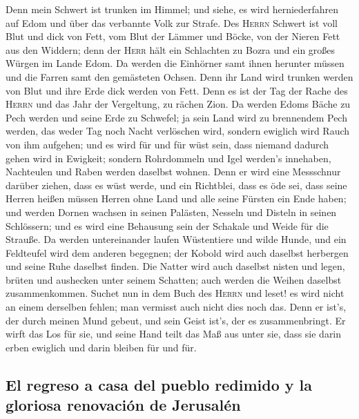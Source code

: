  Denn mein Schwert ist trunken im Himmel; und siehe, es
wird herniederfahren auf Edom und über das verbannte Volk zur Strafe.
 Des \textsc{Herrn} Schwert ist voll Blut und dick von
Fett, vom Blut der Lämmer und Böcke, von der Nieren Fett aus den
Widdern; denn der \textsc{Herr} hält ein Schlachten zu Bozra und ein
großes Würgen im Lande Edom.  Da werden die Einhörner samt
ihnen herunter müssen und die Farren samt den gemästeten Ochsen. Denn
ihr Land wird trunken werden von Blut und ihre Erde dick werden von
Fett.  Denn es ist der Tag der Rache des \textsc{Herrn}
und das Jahr der Vergeltung, zu rächen Zion.  Da werden
Edoms Bäche zu Pech werden und seine Erde zu Schwefel; ja sein Land wird
zu brennendem Pech werden,  das weder Tag noch Nacht
verlöschen wird, sondern ewiglich wird Rauch von ihm aufgehen; und es
wird für und für wüst sein, dass niemand dadurch gehen wird in Ewigkeit;
 sondern Rohrdommeln und Igel werden's innehaben,
Nachteulen und Raben werden daselbst wohnen. Denn er wird eine
Messschnur darüber ziehen, dass es wüst werde, und ein Richtblei, dass
es öde sei,  dass seine Herren heißen müssen Herren ohne
Land und alle seine Fürsten ein Ende haben;  und werden
Dornen wachsen in seinen Palästen, Nesseln und Disteln in seinen
Schlössern; und es wird eine Behausung sein der Schakale und Weide für
die Strauße.  Da werden untereinander laufen Wüstentiere
und wilde Hunde, und ein Feldteufel wird dem anderen begegnen; der
Kobold wird auch daselbst herbergen und seine Ruhe daselbst finden.
 Die Natter wird auch daselbst nisten und legen, brüten
und aushecken unter seinem Schatten; auch werden die Weihen daselbst
zusammenkommen.  Suchet nun in dem Buch des
\textsc{Herrn} und leset! es wird nicht an einem derselben fehlen; man
vermisst auch nicht dies noch das. Denn er ist's, der durch meinen Mund
gebeut, und sein Geist ist's, der es zusammenbringt.  Er
wirft das Los für sie, und seine Hand teilt das Maß aus unter sie, dass
sie darin erben ewiglich und darin bleiben für und für.

\hypertarget{el-regreso-a-casa-del-pueblo-redimido-y-la-gloriosa-renovaciuxf3n-de-jerusaluxe9n}{%
\subsection{El regreso a casa del pueblo redimido y la gloriosa
renovación de
Jerusalén}\label{el-regreso-a-casa-del-pueblo-redimido-y-la-gloriosa-renovaciuxf3n-de-jerusaluxe9n}}

